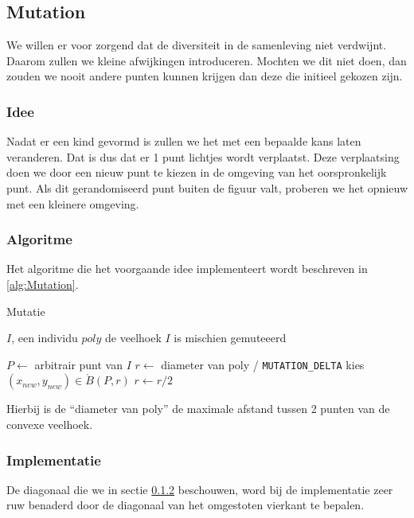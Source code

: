 %
\subsection{Mutation}
\label{sub:Mutation}
We willen er voor zorgend dat de diversiteit in de samenleving niet verdwijnt. Daarom zullen we kleine afwijkingen introduceren. Mochten we dit niet doen, dan zouden we nooit andere punten kunnen krijgen dan deze die initieel gekozen zijn.

\subsubsection{Idee}
Nadat er een kind gevormd is zullen we het met een bepaalde kans laten veranderen. Dat is dus dat er 1 punt lichtjes wordt verplaatst. Deze verplaatsing doen we door een nieuw punt te kiezen in de omgeving van het oorspronkelijk punt. Als dit gerandomiseerd punt buiten de figuur valt, proberen we het opnieuw met een kleinere omgeving.

\subsubsection{Algoritme}
\label{ssub:MutationAlgorithm}
Het algoritme die het voorgaande idee implementeert wordt beschreven in \ref{alg:Mutation}.
	\begin{algorithm}[H]
	 	\caption{Mutatie}
		\begin{algorithmic}
		\Require \State $I$, een individu \State $poly$ de veelhoek
		\Ensure $I$ is mischien gemuteeerd 
		
			\State $P \gets$ arbitrair punt van $I$ 
			\State $r \gets$ diameter van poly / \texttt{MUTATION\_DELTA}
			\Repeat 
			\State kies $(x_{new},y_{new}) \in \mathring{B}(P,r)$
			\State $r \gets r/2$
		\EndIf		
		\end{algorithmic}
		\label{alg:Mutation}
	\end{algorithm}		
Hierbij is de ``diameter van poly'' de maximale afstand tussen 2 punten van de convexe veelhoek.

\subsubsection{Implementatie}
\label{ssub:MutationImplementation}
De diagonaal die we in sectie \ref{ssub:MutationAlgorithm} beschouwen, word bij de implementatie zeer ruw benaderd door de diagonaal van het omgestoten vierkant te bepalen.

